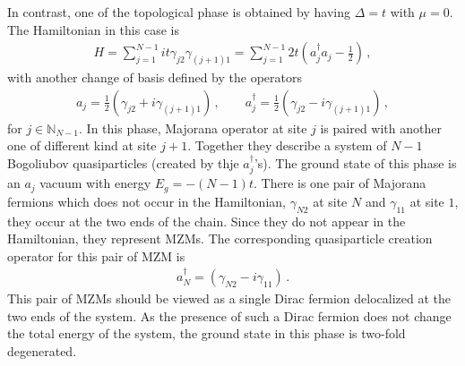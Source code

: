 \documentclass[11pt, oneside]{book}
\theoremstyle{break}
\theoremstyle{break}
\newcommand{\N}{\mathbb{N}}
\begin{document}
In contrast, one of the topological phase is obtained by having $\Delta = t$ with $\mu = 0$. The Hamiltonian in this case is
\begin{align}
H = \sum_{j=1}^{N-1} it \gamma_{j2}\gamma_{(j+1)1}= \sum_{j=1}^{N-1} 2t\left( a^\dagger_{j} a_j -\frac{1}{2}\right)\,,
\end{align}
with another change of basis defined by the operators
\begin{align}
a_j = \frac{1}{2}\left(\gamma_{j2}+i\gamma_{(j+1)1}\right)\,,\qquad
a_j^\dagger = \frac{1}{2}\left( \gamma_{j2} - i\gamma_{(j+1)1}\right)\,,
\end{align}
for $j \in \N_{N-1}$. In this phase, Majorana operator at site $j$ is paired with another one of different kind at site $j+1$. Together they describe a system of $N-1$ Bogoliubov quasiparticles (created by thje $a_j^\dagger$'s). The ground state of this phase is an $a_j$ vacuum with energy $E_g = -(N-1)t$. There is one pair of Majorana fermions which does not occur in the Hamiltonian, $\gamma_{N2}$ at site $N$ and $\gamma_{11}$ at site $1$, they occur at the two ends of the chain. Since they do not appear in the Hamiltonian, they represent MZMs. The corresponding quasiparticle creation operator for this pair of MZM is
\begin{align}
a_N^{\dagger} = \left( \gamma_{N2} - i \gamma_{11}\right)\,.
\end{align}
This pair of MZMs should be viewed as a single Dirac fermion delocalized at the two ends of the system. As the presence of such a Dirac fermion does not change the total energy of the system, the ground state in this phase is two-fold degenerated. \\
\end{document}
